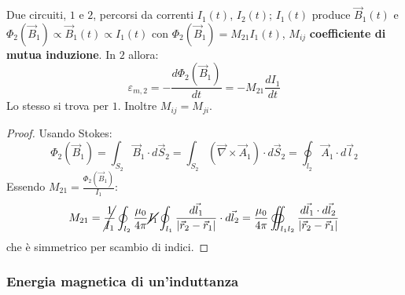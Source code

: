 \documentclass[10pt, a4paper]{scrartcl}
\numberwithin{equation}{subsection}
\theoremstyle{style1}
\newenvironment{boxenv}[1][]{
    \begin{eqbox}[#1]
    }{
   \end{eqbox}
}
\begin{document}
Due circuiti, $1$ e $2$, percorsi da correnti $I_1(t)$, $I_2(t)$; $I_1(t)$ produce $\vec{B}_1(t)$ e $\Phi_2(\vec{B}_1) \propto \vec{B}_1(t)\propto I_1(t)$ con $\Phi_2(\vec{B}_1) = M_{21}I_1(t)$, $M_{ij} $ \textbf{coefficiente di mutua induzione}. In $2$ allora:
\begin{equation}
	\varepsilon _{m,2} = -\frac{d \Phi_2(\vec{B}_1)}{d t} = - M_{21} \frac{d I_1}{d t}  
\end{equation}
Lo stesso si trova per $1$. Inoltre $M_{ij} = M_{ji} $.
\begin{boxenv}[]
\begin{proof}
	Usando Stokes:
	\begin{equation}
		\Phi_2(\vec{B}_1) = \int_{S_2} \vec{B}_1 \cdot d\vec{S}_2 = \int_{S_2} (\vec{\nabla }\times \vec{A}_1) \cdot d\vec{S}_2 = \oint_{l_2} \vec{A}_1 \cdot d\vec{l}_2
	\end{equation}
	Essendo $M_{21}= \frac{\Phi_2(\vec{B}_1)}{I_1}$:
	\begin{equation}
		M_{21} = \cancel{\frac{1}{I_1}}\oint_{l_2} \frac{\mu_0}{4\pi}\cancel{I_1} \oint_{l_1} \frac{d\vec{l}_1}{\left\lvert \vec{r}_2 - \vec{r}_1 \right\rvert }\cdot d\vec{l}_2=\frac{\mu_0}{4\pi}\oiint_{l_1l_2} \frac{d\vec{l}_1\cdot d\vec{l}_2}{\left\lvert \vec{r}_2 -\vec{r}_1\right\rvert }
	\end{equation}
	che \`e simmetrico per scambio di indici.
\end{proof}
\end{boxenv}

\subsubsection{Energia magnetica di un'induttanza}
\end{document}
